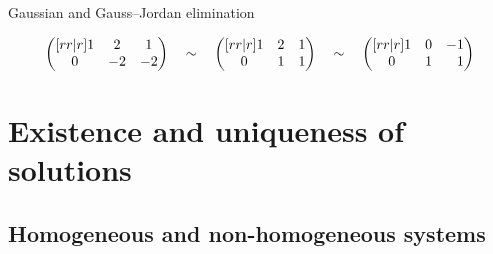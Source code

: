 \documentclass%
[handout]%
{beamer}
\begin{document}
\begin{frame}{Gaussian and Gauss--Jordan elimination}
\begin{example}
  \[
\begin{pmatrix}[rr|r]
    1 & 2 & 1\\
    0 & -2 & -2
\end{pmatrix}
\quad\sim \quad
\begin{pmatrix}[rr|r]
    1 & 2 & 1\\
    0 & 1 & 1
\end{pmatrix}
\quad\sim \quad
\begin{pmatrix}[rr|r]
    1 & 0 & -1\\
    0 & 1 & \hphantom{-}1
\end{pmatrix}
\]
\end{example}

\end{frame}

%
\section{Existence and uniqueness of solutions}
%

\subsection{Homogeneous and non-homogeneous systems}
\end{document}
